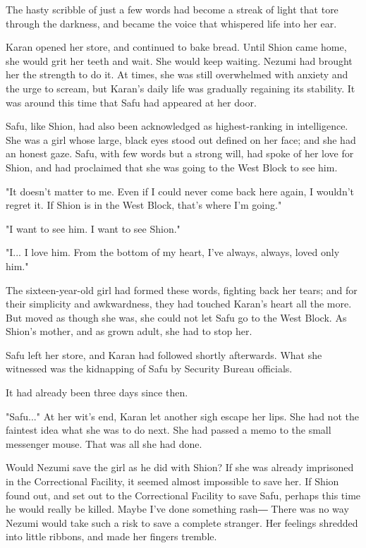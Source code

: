 The hasty scribble of just a few words had become a streak of light that
tore through the darkness, and became the voice that whispered life into
her ear.

Karan opened her store, and continued to bake bread. Until Shion came
home, she would grit her teeth and wait. She would keep waiting. Nezumi
had brought her the strength to do it. At times, she was still
overwhelmed with anxiety and the urge to scream, but Karan's daily life
was gradually regaining its stability. It was around this time that Safu
had appeared at her door.

Safu, like Shion, had also been acknowledged as highest-ranking in
intelligence. She was a girl whose large, black eyes stood out defined
on her face; and she had an honest gaze. Safu, with few words but a
strong will, had spoke of her love for Shion, and had proclaimed that
she was going to the West Block to see him.

"It doesn't matter to me. Even if I could never come back here again, I
wouldn't regret it. If Shion is in the West Block, that's where I'm
going."

"I want to see him. I want to see Shion."

"I... I love him. From the bottom of my heart, I've always, always,
loved only him."

The sixteen-year-old girl had formed these words, fighting back her
tears; and for their simplicity and awkwardness, they had touched
Karan's heart all the more. But moved as though she was, she could not
let Safu go to the West Block. As Shion's mother, and as grown adult,
she had to stop her.

Safu left her store, and Karan had followed shortly afterwards. What she
witnessed was the kidnapping of Safu by Security Bureau officials.

It had already been three days since then.

"Safu..." At her wit's end, Karan let another sigh escape her lips. She
had not the faintest idea what she was to do next. She had passed a memo
to the small messenger mouse. That was all she had done.

Would Nezumi save the girl as he did with Shion? If she was already
imprisoned in the Correctional Facility, it seemed almost impossible to
save her. If Shion found out, and set out to the Correctional Facility
to save Safu, perhaps this time he would really be killed. Maybe I've
done something rash― There was no way Nezumi would take such a risk to
save a complete stranger. Her feelings shredded into little ribbons, and
made her fingers tremble.

